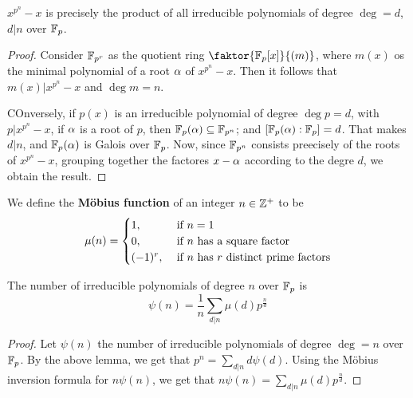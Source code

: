 \begin{lemma}\label{2.3.3}
    $x^{p^n}-x$ is precisely the product of all irreducible polynomials of
    degree $\deg=d$, $d|n$ over  $\mathbb{F}_p$.
\end{lemma}
\begin{proof}
    Consider $\mathbb{F}_{p^r}$ as the quotient ring $\faktor{\F_p[x]}{(m)}$, where
    $m(x)$ os the minimal polynomial of a root $\alpha$ of  $x^{p^n}-x$. Then it
    follows that $m(x)|x^{p^n}-x$ and $\deg{m}=n$.

    COnversely, if $p(x)$ is an irreducible polynomial of degree $\deg{p}=d$,
    with $p|x^{p^n}-x$, if $\alpha$ is a root of  $p$, then  $\mathbb{F}_p(\alpha) \subseteq
    \mathbb{F}_{p^n}$; and $[\mathbb{F}_p(\alpha) : \mathbb{F}_p]=d$. That makes $d|n$, and $\mathbb{F}_p(\alpha)$
    is Galois over $\mathbb{F}_p$. Now, since $\mathbb{F}_{p^n}$ consists preecisely of the
    roots of $x^{p^n}-x$, grouping together the factores $x-\alpha$ according to the
    degre $d$, we obtain the result.
\end{proof}

\begin{definition}
    We define the \textbf{M\"obius function} of an integer $n \in \mathbb{Z}^+$ to be
    \begin{equation*}
        \mu(n)=\begin{cases}
            1,  &   \text{ if } n=1 \\
            0,  &   \text{ if } n \text{ has a square factor} \\
            (-1)^r,  &   \text{ if } n \text{ has } r \text{ distinct prime
            factors} \\
        \end{cases}
    \end{equation*}
\end{definition}

\begin{theorem}\label{2.3.4}
    The number of irreducible polynomials of degree $n$ over  $\mathbb{F}_p$ is
    \begin{equation*}
        \psi(n)=\frac{1}{n}\sum_{d|n}{\mu(d)p^{\frac{n}{d}}}
    \end{equation*}
\end{theorem}
\begin{proof}
    Let $\psi(n)$ the number of irreducible polynomials of degree $\deg=n$ over
    $\mathbb{F}_p$. By the above lemma, we get that  $p^n=\sum_{d|n}{d\psi(d)}$. Using
    the M\"obius inversion formula for $n\psi(n)$, we get that
    $n\psi(n)=\sum_{d|n}{\mu(d)p^{\frac{n}{d}}}$.
\end{proof}
